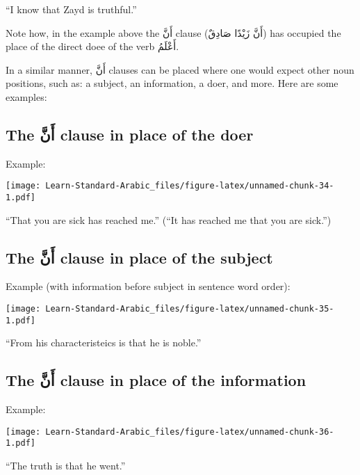 \documentclass[
  10pt,
]{book}
\begin{document}
\enquote{I know that Zayd is truthful.}

Note how, in the example above the
\foreignlanguage{arabic}{أَنَّ}
clause
(\foreignlanguage{arabic}{أَنَّ زَيْدًا صَادِقٌ})
has occupied the place of the direct doee of the verb \foreignlanguage{arabic}{أَعْلَمُ}.

In a similar manner,
\foreignlanguage{arabic}{أَنَّ}
clauses can be placed where one would expect other noun positions, such as: a subject, an information, a doer, and more. Here are some examples:

\subsection{\texorpdfstring{The \foreignlanguage{arabic}{أَنَّ} clause in place of the doer}{The أَنَّ clause in place of the doer}}\label{the-ux623ux646-clause-in-place-of-the-doer}

Example:

\texttt{[image: Learn-Standard-Arabic\_files/figure-latex/unnamed-chunk-34-1.pdf]}

\enquote{That you are sick has reached me.} (\enquote{It has reached me that you are sick.})

\subsection{\texorpdfstring{The \foreignlanguage{arabic}{أَنَّ} clause in place of the subject}{The أَنَّ clause in place of the subject}}\label{the-ux623ux646-clause-in-place-of-the-subject}

Example (with information before subject in sentence word order):

\texttt{[image: Learn-Standard-Arabic\_files/figure-latex/unnamed-chunk-35-1.pdf]}

\enquote{From his characteristeics is that he is noble.}

\subsection{\texorpdfstring{The \foreignlanguage{arabic}{أَنَّ} clause in place of the information}{The أَنَّ clause in place of the information}}\label{the-ux623ux646-clause-in-place-of-the-information}

Example:

\texttt{[image: Learn-Standard-Arabic\_files/figure-latex/unnamed-chunk-36-1.pdf]}

\enquote{The truth is that he went.}
\end{document}
